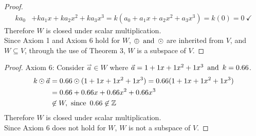 \documentclass{article}
\begin{document}
\begin{enumerate}
\begin{proof}
\begin{align*}
            ka_0            & +ka_1x+ka_2x^2+ka_3x^3 = k(a_0+a_1x+a_2x^2+a_3x^3) = k(0) = 0~\checkmark
        \end{align*}
        Therefore $W$ is closed under scalar multiplication. \\
        Since Axiom 1 and Axiom 6 hold for $W$, $\oplus \operatorname{~\text{and}~} \odot$ are inherited from $V$, and $W \subseteq V$, through the use of Theorem 3, $W$ is a subspace of $V$.
    \end{proof}
    \begin{proof}
        Axiom 6: Consider $\vec{a} \in W$ where $\vec{a} = 1+1x+1x^2+1x^3 \operatorname{~\text{and}~} k = 0.66$.
        \begin{align*}
            k \odot \vec{a} & = 0.66 \odot (1+1x+1x^2+1x^3) = 0.66(1+1x+1x^2+1x^3) \\
                            & = 0.66+0.66x+0.66x^2+0.66x^3                         \\
                            & \not \in W, \operatorname{~\text{since}~} 0.66 \not \in \mathbb{Z}
        \end{align*}
        Therefore $W$ is  closed under scalar multiplication. \\
        Since Axiom 6 does not hold for $W$, $W$ is not a subspace of $V$.
    \end{proof}
\end{enumerate}
\end{document}

